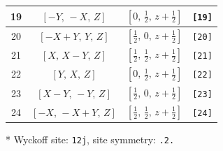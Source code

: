 \documentclass[fleqn,8pt]{jsarticle}
\begin{document}
\begin{longtable}{cccc}
19 & $\left[ - Y,\, - X,\, Z \right]$ & $\left[ 0,\, \frac{1}{2},\, z + \frac{1}{2} \right]$ & {\tt [19]} \\ \hline
20 & $\left[ - X + Y,\, Y,\, Z \right]$ & $\left[ \frac{1}{2},\, 0,\, z + \frac{1}{2} \right]$ & {\tt [20]} \\ \hline
21 & $\left[ X,\, X - Y,\, Z \right]$ & $\left[ \frac{1}{2},\, \frac{1}{2},\, z + \frac{1}{2} \right]$ & {\tt [21]} \\ \hline
22 & $\left[ Y,\, X,\, Z \right]$ & $\left[ 0,\, \frac{1}{2},\, z + \frac{1}{2} \right]$ & {\tt [22]} \\ \hline
23 & $\left[ X - Y,\, - Y,\, Z \right]$ & $\left[ \frac{1}{2},\, 0,\, z + \frac{1}{2} \right]$ & {\tt [23]} \\ \hline
24 & $\left[ - X,\, - X + Y,\, Z \right]$ & $\left[ \frac{1}{2},\, \frac{1}{2},\, z + \frac{1}{2} \right]$ & {\tt [24]} \\
\end{longtable}
* Wyckoff site: {\tt 12j}, site symmetry: {\tt .2.}
\renewcommand{\arraystretch}{1.2}
\end{document}
